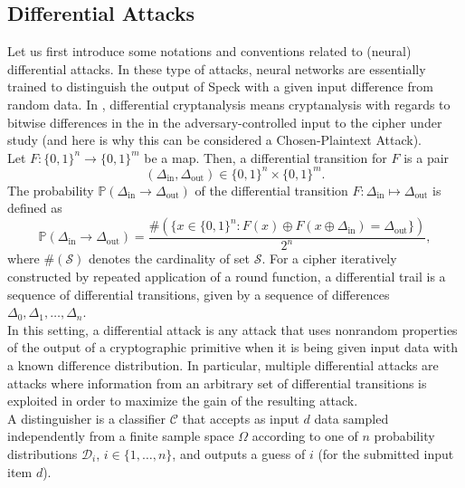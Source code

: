 \documentclass[%
    corpo=11pt,
    twoside,
    stile=classica,
    oldstyle,
    autoretitolo,
    tipotesi=magistrale,
    greek,
    evenboxes,
    english
]{toptesi}
\begin{document}
\subsection{Differential Attacks}
Let us first introduce some notations and conventions related to (neural) differential attacks. In these type of attacks, neural networks are essentially trained to distinguish the output of Speck with a given input difference from random data. In \cite{gohr}, differential cryptanalysis means cryptanalysis with regards to bitwise differences in the in the adversary-controlled input to the cipher under study (and here is why this can be considered a Chosen-Plaintext Attack). \\
Let $F: \{0,1\}^n \longrightarrow \{0,1\}^m$ be a map. Then, a differential transition for $F$ is a pair
\begin{equation}
\left(\Delta_{\text{in}},\Delta_{\text{out}} \right) \in \{0,1\}^n \times \{0,1\}^m.
\end{equation}
The probability $\mathbb{P}\left( \Delta_{\text{in}} \rightarrow \Delta_{\text{out}}\right)$ of the differential transition $F:\Delta_{\text{in}} \mapsto \Delta_{\text{out}} $ is defined as
\begin{equation}
\mathbb{P}\left( \Delta_{\text{in}} \rightarrow \Delta_{\text{out}}\right) =
\frac{\#\left(\{x \in \{0,1\}^n: F(x) \oplus F(x \oplus \Delta_{\text{in}} ) = \Delta_{\text{out}} \} \right)}{2^n},
\end{equation}
where $\#(\mathcal{S})$ denotes the cardinality of set $\mathcal{S}$. For a cipher iteratively constructed by repeated application of a round function, a differential trail is a sequence of differential transitions, given by a sequence of differences $\Delta_0, \Delta_1, \dots, \Delta_n$. \\
In this setting, a differential attack is any attack that uses nonrandom properties of the output of a cryptographic primitive when it is being given input data with a known difference distribution. In particular, multiple differential attacks are attacks where information from an arbitrary set of differential transitions is exploited in order to maximize the gain of the resulting attack. \\
A distinguisher is a classifier $\mathcal{C}$ that accepts as input $d$ data sampled independently from a finite sample space $\Omega$ according to one of $n$ probability distributions $\mathcal{D}_i$, $i \in \{1,\dots,n\}$, and outputs a guess of $i$ (for the submitted input item $d$). \\
\end{document}
